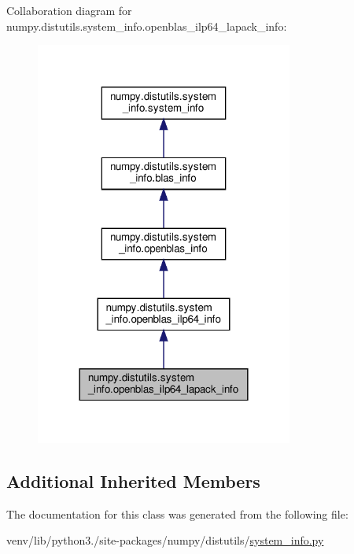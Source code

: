 Collaboration diagram for numpy.\+distutils.\+system\+\_\+info.\+openblas\+\_\+ilp64\+\_\+lapack\+\_\+info\+:
\nopagebreak
\begin{figure}[H]
\begin{center}
\leavevmode
\includegraphics[width=240pt]{classnumpy_1_1distutils_1_1system__info_1_1openblas__ilp64__lapack__info__coll__graph}
\end{center}
\end{figure}
\subsection*{Additional Inherited Members}


The documentation for this class was generated from the following file\+:\begin{DoxyCompactItemize}
\item 
venv/lib/python3./site-\/packages/numpy/distutils/\hyperlink{system__info_8py}{system\+\_\+info.\+py}\end{DoxyCompactItemize}
